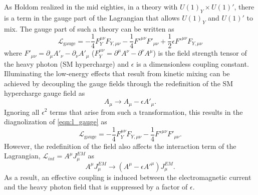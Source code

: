 As Holdom \cite{holdom1986} realized in the mid eighties, in a theory with 
$U(1)_Y \times U(1)'$, there is a term in the gauge part of the Lagrangian 
that allows $U(1)_Y$ and $U(1)'$ to mix.  The gauge part of such a theory can
be written as
\begin{equation}
    \mathcal{L}_{\text{gauge}} = - \frac{1}{4} F_Y^{\mu \nu}F_{Y, \mu \nu}
                          - \frac{1}{4} F'^{\mu \nu}F'_{\mu \nu}
                          + \frac{1}{2} \epsilon F'^{\mu \nu} F_{Y, \mu \nu}
    \label{eqn:l_gauge}
\end{equation}
where $F'_{\mu \nu} = \partial_{\mu}A'_{\nu} - \partial_{\nu}A'_{\mu}$ 
($F^{\mu \nu}_{Y} = \partial^{\mu}A^{\nu} - \partial^{\nu}A^{\mu}$) is the
field strength tensor of the heavy photon (SM hypercharge) and $\epsilon$ is a
dimensionless coupling constant.  Illuminating the low-energy effects that result
from kinetic mixing can be achieved by decoupling the gauge fields through the
redefinition of the SM hypercharge gauge field as
\begin{equation}
    A_{\mu} \rightarrow A_{\mu} - \epsilon A'_{\mu}.
\end{equation}
Ignoring all $\epsilon^2$ terms that arise from such a transformation, this
results in the diagnolization of \ref{eqn:l_gauge} as
\begin{equation}
    \mathcal{L}_{\text{gauge}} = - \frac{1}{4} F_Y^{\mu \nu}F_{Y, \mu \nu}
                          - \frac{1}{4} F'^{\mu \nu}F'_{\mu \nu}.
\end{equation}
However, the redefinition of the field also affects the interaction term of 
the Lagrangian, $\mathcal{L}_{int} = A^{\mu}J_{\mu}^{EM}$ as
\begin{equation}
    A^{\mu}J_{\mu}^{EM} \rightarrow (A^{\mu} - \epsilon A'^{\mu})J_{\mu}^{EM}.
\end{equation}
As a result, an effective coupling is induced between the electromagnetic current and 
the heavy photon field that is suppressed by a factor of $\epsilon$.

